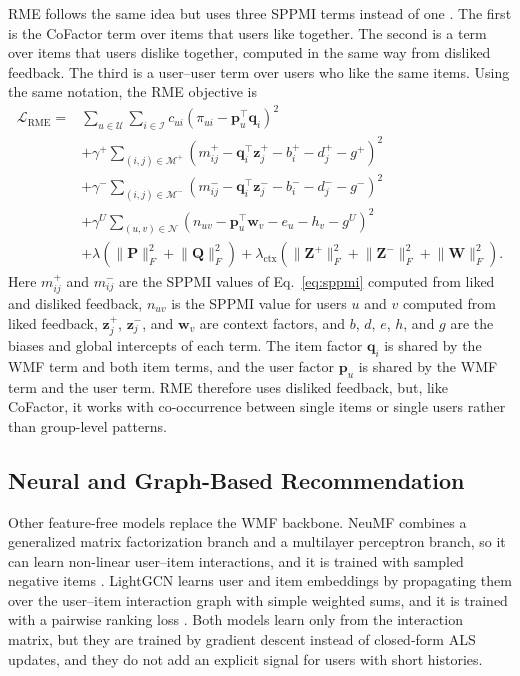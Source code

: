 \documentclass[pdflatex,sn-vancouver-num]{sn-jnl}%
\theoremstyle{thmstyleone}%
\theoremstyle{thmstyletwo}%
\theoremstyle{thmstylethree}%
\begin{document}
RME follows the same idea but uses three SPPMI terms instead of one \cite{tran2018rme}. The first is the CoFactor term over items that users like together. The second is a term over items that users dislike together, computed in the same way from disliked feedback. The third is a user--user term over users who like the same items. Using the same notation, the RME objective is
\begin{equation}
\begin{aligned}
\mathcal{L}_{\mathrm{RME}}
=&
\sum_{u\in\mathcal{U}}\sum_{i\in\mathcal{I}}
c_{ui}
\left(
\pi_{ui}-\mathbf{p}_u^{\top}\mathbf{q}_i
\right)^2 \\
&+
\gamma^{+}
\sum_{(i,j)\in\mathcal{M}^{+}}
\left(
m^{+}_{ij}
-\mathbf{q}_i^{\top}\mathbf{z}^{+}_j
-b^{+}_i-d^{+}_j-g^{+}
\right)^2 \\
&+
\gamma^{-}
\sum_{(i,j)\in\mathcal{M}^{-}}
\left(
m^{-}_{ij}
-\mathbf{q}_i^{\top}\mathbf{z}^{-}_j
-b^{-}_i-d^{-}_j-g^{-}
\right)^2 \\
&+
\gamma^{U}
\sum_{(u,v)\in\mathcal{N}}
\left(
n_{uv}
-\mathbf{p}_u^{\top}\mathbf{w}_v
-e_u-h_v-g^{U}
\right)^2 \\
&+
\lambda
\left(
\lVert\mathbf{P}\rVert_F^2+
\lVert\mathbf{Q}\rVert_F^2
\right)
+
\lambda_{\mathrm{ctx}}
\left(
\lVert\mathbf{Z}^{+}\rVert_F^2+
\lVert\mathbf{Z}^{-}\rVert_F^2+
\lVert\mathbf{W}\rVert_F^2
\right).
\end{aligned}
\label{eq:rme_objective}
\end{equation}
Here $m^{+}_{ij}$ and $m^{-}_{ij}$ are the SPPMI values of Eq.~\eqref{eq:sppmi} computed from liked and disliked feedback, $n_{uv}$ is the SPPMI value for users $u$ and $v$ computed from liked feedback, $\mathbf{z}^{+}_j$, $\mathbf{z}^{-}_j$, and $\mathbf{w}_v$ are context factors, and $b$, $d$, $e$, $h$, and $g$ are the biases and global intercepts of each term. The item factor $\mathbf{q}_i$ is shared by the WMF term and both item terms, and the user factor $\mathbf{p}_u$ is shared by the WMF term and the user term. RME therefore uses disliked feedback, but, like CoFactor, it works with co-occurrence between single items or single users rather than group-level patterns.

\subsection{Neural and Graph-Based Recommendation}

Other feature-free models replace the WMF backbone. NeuMF combines a generalized matrix factorization branch and a multilayer perceptron branch, so it can learn non-linear user--item interactions, and it is trained with sampled negative items \cite{he2017ncf}. LightGCN learns user and item embeddings by propagating them over the user--item interaction graph with simple weighted sums, and it is trained with a pairwise ranking loss \cite{he2020lightgcn}. Both models learn only from the interaction matrix, but they are trained by gradient descent instead of closed-form ALS updates, and they do not add an explicit signal for users with short histories.
\end{document}
